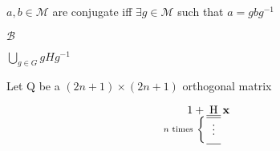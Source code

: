 \documentclass{article}
\begin{document}
\(a, b \in \mathcal M\) are conjugate iff \(\mathop\exists g \in \mathcal M\) such that \(a = g b g^{-1}\)

\(\mathscr B\)

\(\bigcup\limits_{g \in G} g H g^{-1}\)

Let Q be a \((2n+1)\times(2n+1)\) orthogonal matrix

\begin{equation*}
 1 +
 \underset{
  \mathllap{\text{\(n\) times}
  \ \left\{
   \vphantom{
    \begin{array}{r}
     \hline \hline \vdots \\[1ex] \hline
    \end{array}
   } \right.
  }
  \begin{array}{r}
   \hline \hline \vdots \\[1ex] \hline
  \end{array}
 }
 {\mathrm H}\,\mathbf x
\end{equation*}
\end{document}
